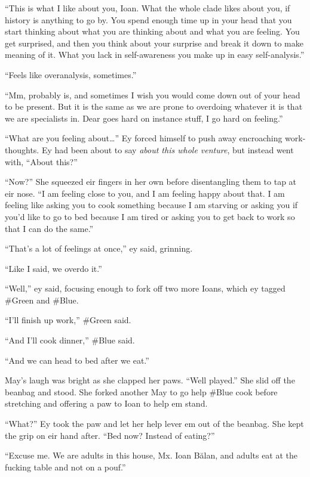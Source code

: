 ``This is what I like about you, Ioan. What the whole clade likes about you, if history is anything to go by. You spend enough time up in your head that you start thinking about what you are thinking about and what you are feeling. You get surprised, and then you think about your surprise and break it down to make meaning of it. What you lack in self-awareness you make up in easy self-analysis.''

``Feels like overanalysis, sometimes.''

``Mm, probably is, and sometimes I wish you would come down out of your head to be present. But it is the same as we are prone to overdoing whatever it is that we are specialists in. Dear goes hard on instance stuff, I go hard on feeling.''

``What are you feeling about\ldots{}'' Ey forced himself to push away encroaching work-thoughts. Ey had been about to say \emph{about this whole venture}, but instead went with, ``About this?''

``Now?'' She squeezed eir fingers in her own before disentangling them to tap at eir nose. ``I am feeling close to you, and I am feeling happy about that. I am feeling like asking you to cook something because I am starving or asking you if you'd like to go to bed because I am tired or asking you to get back to work so that I can do the same.''

``That's a lot of feelings at once,'' ey said, grinning.

``Like I said, we overdo it.''

``Well,'' ey said, focusing enough to fork off two more Ioans, which ey tagged \#Green and \#Blue.

``I'll finish up work,'' \#Green said.

``And I'll cook dinner,'' \#Blue said.

``And we can head to bed after we eat.''

May's laugh was bright as she clapped her paws. ``Well played.'' She slid off the beanbag and stood. She forked another May to go help \#Blue cook before stretching and offering a paw to Ioan to help em stand.

``What?'' Ey took the paw and let her help lever em out of the beanbag. She kept the grip on eir hand after. ``Bed now? Instead of eating?''

``Excuse me. We are adults in this house, Mx. Ioan Bălan, and adults eat at the fucking table and not on a pouf.''
